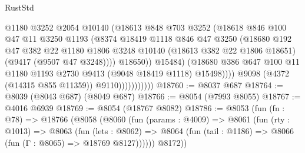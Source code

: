 \begin{lexlean}{RustStd}
\begin{coremodule}
                                  @1180
                                  @3252
                                  @2054
                                  @10140
                                  (@18613
                                    @848
                                    @703
                                    @3252
                                    (@18618
                                      @846
                                      @100
                                      @47
                                      @11
                                      @3250
                                      @1193
                                      (@8374
                                        @18419
                                        @1118
                                        @846
                                        @47
                                        @3250
                                        (@18680
                                          @192
                                          @47
                                          @382
                                          @22
                                          @1180
                                          @1806
                                          @3248
                                          @10140
                                          (@18613 @382 @22 @1806 @18651)
                                          (@9417 (@9507 @47 @3248))))
                                      @18650))
                                  @15484)
                                (@18680
                                  @386
                                  @647
                                  @100
                                  @11
                                  @1180
                                  @1193
                                  @2730
                                  @9413
                                  (@9048 @18419 @1118)
                                  @15498))))
                          @9098
                          (@4372 (@14315 @855 @11359))
                          @9110)))))))))))
@18760 := @8037 @687
@18764 := @8039 (@8043 @687) (@8049 @687)
@18766 := @8054 (@7993 @8055)
@18767 := @4016 @6939
@18769 := @8054 (@18767 @8082)
@18786 := @8053
    (fun (fn : @78) =>
    @18766
      (@8058
        (@8060
          (fun (params : @4009) =>
          @8061
            (fun (rty : @1013) =>
            @8063
              (fun (lets : @8062) =>
              @8064 (fun (tail : @1186) => @8066 (fun (Γ : @8065) => @18769 @8127))))))
        @8172))

\end{coremodule}
\end{lexlean}
